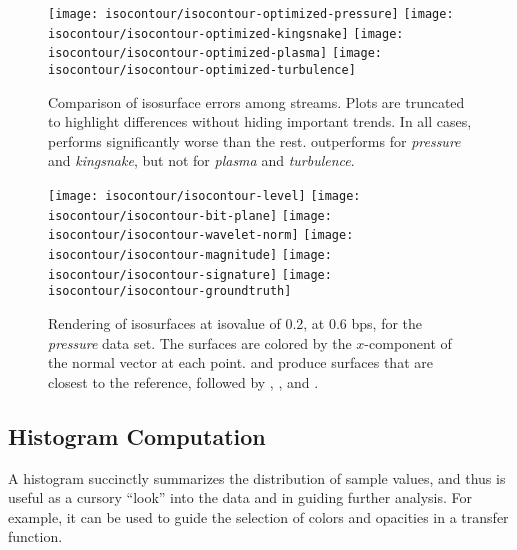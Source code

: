 \begin{figure*}[t]
\centering
{}
{\texttt{[image: isocontour/isocontour-optimized-pressure]}}
{\texttt{[image: isocontour/isocontour-optimized-kingsnake]}}
{\texttt{[image: isocontour/isocontour-optimized-plasma]}}
{\texttt{[image: isocontour/isocontour-optimized-turbulence]}}
\caption{Comparison of isosurface errors among streams. Plots are truncated to highlight differences
without hiding important trends. In all cases, \slvl performs significantly worse than the rest.
\swav outperforms \sbit for \emph{pressure} and \emph{kingsnake}, but not for \emph{plasma} and \emph{turbulence}.}\label{fig:isocontour-plots}
\vspace{1em}

\centering
{}
{\texttt{[image: isocontour/isocontour-level]}}
{\texttt{[image: isocontour/isocontour-bit-plane]}}
{\texttt{[image: isocontour/isocontour-wavelet-norm]}}
{\texttt{[image: isocontour/isocontour-magnitude]}}
{\texttt{[image: isocontour/isocontour-signature]}}
{\texttt{[image: isocontour/isocontour-groundtruth]}}
\caption{Rendering of isosurfaces at isovalue of 0.2, at 0.6 bps, for the \emph{pressure} data set.
The surfaces are colored by the $x$-component of the normal vector at each point. \swav and
\sisg produce surfaces that are closest to the reference, followed by \sbit, \smag, and \slvl.}
\label{fig:isocontour-surfaces-pressure}
\vspace{-1em}
\end{figure*}


\subsection{Histogram Computation}\label{sec:histogram}

A histogram succinctly summarizes the distribution of sample values, and thus is useful as a cursory
``look'' into the data and in guiding further analysis. For example, it can be used to guide the
selection of colors and opacities in a transfer function.

